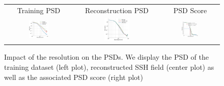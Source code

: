 \documentclass[draft]{agujournal2019}
\begin{document}
\begin{figure}[H]
\small
\setlength{\tabcolsep}{1pt}
\begin{tabular}{ccc}

\hspace{3mm} Training PSD & 
\hspace{3mm} Reconstruction PSD & 
\hspace{3mm} PSD Score  \\


\includegraphics[width=0.31\textwidth]{figures/plots2/isotrop_psd_res_train.png} &
\includegraphics[width=0.31\textwidth]{figures/plots2/isotrop_psd_res_rec.png} &
\includegraphics[width=0.31\textwidth]{figures/plots2/res_1d_psd_score.png}


\end{tabular}
\vspace{-3mm}
\caption{
Impact of the resolution on the PSDs. We display the PSD of the training dataset (left plot), reconstructed SSH field (center plot) as well as the associated PSD score (right plot)}\vspace{-5mm}
\label{fig:respsd}
\end{figure}
\end{document}
